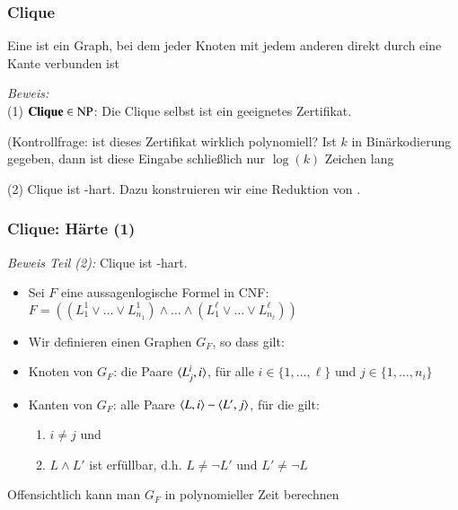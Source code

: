 \documentclass[aspectratio=1610,onlymath]{beamer}
\begin{document}
\begin{frame}\frametitle{Clique}

Eine  ist ein Graph, bei dem jeder Knoten mit jedem anderen
direkt durch eine Kante verbunden ist\medskip

\medskip\pause

\pause

\emph{Beweis:}\\
(1) $\textbf{\textcolor{black}{Clique}}\in{\textsc{NP}}$: Die Clique selbst ist ein geeignetes Zertifikat.\\[1ex] {\tiny(Kontrollfrage: ist dieses Zertifikat wirklich polynomiell? Ist $k$ in Binärkodierung gegeben, dann ist diese Eingabe schließlich nur $\log(k)$ Zeichen lang \ghost{\ldots)}\pause

}\medskip

(2) Clique ist -hart. Dazu konstruieren wir eine Reduktion von .

\end{frame}

\begin{frame}\frametitle{Clique: Härte (1)}

\emph{Beweis Teil (2):} Clique ist -hart.
\begin{itemize}
\item Sei $F$ eine aussagenlogische Formel in CNF:\\
$F=\left((L^1_1\vee \ldots\vee L^1_{n_1})\wedge \ldots\wedge (L^\ell_1\vee \ldots\vee L^\ell_{n_\ell})\right)$\pause
%
\item Wir definieren einen Graphen $G_F$, so dass gilt:\\[1ex]
\pause
%
\item \alert{Knoten von $G_F$:} die Paare $\langle{L^i_j,i}\rangle$, für alle $i\in\{1,\ldots,\ell\}$ und $j\in\{1,\ldots,n_i\}$\pause
%
\item \alert{Kanten von $G_F$:} alle Paare $\langle{L,i}\rangle-\langle{L',j}\rangle$, für die gilt:
\begin{enumerate}[(1)]
\item $i\neq j$ und
\item $L\wedge L'$ ist erfüllbar, d.h. $L\neq \neg L'$ und $L'\neq \neg L$
\end{enumerate}
\end{itemize}
Offensichtlich kann man $G_F$ in polynomieller Zeit berechnen

\end{frame}
\end{document}
